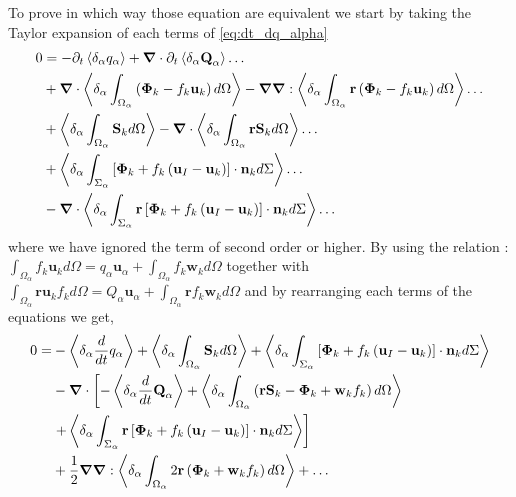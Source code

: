 To prove in which way those equation are equivalent we start by taking the Taylor expansion of each terms of \ref{eq:dt_dq_alpha} 
\begin{align}    
    0 &= 
    - \partial_t \left<\delta_\alpha q_\alpha\right> +  \bm{\nabla} \cdot  \partial_t\left<\delta_\alpha \textbf{Q}_\alpha\right> \ldots\nonumber\\
    &+ \bm{\nabla} \cdot \left<\delta_\alpha \int_{\Omega_\alpha}\left(\mathbf{\Phi}_k - f_k \textbf{u}_k \right)d\Omega\right>
    -\bm{\nabla}\bm{\nabla} : \left<\delta_\alpha \int_{\Omega_\alpha}\textbf{r}\left(\mathbf{\Phi}_k - f_k \textbf{u}_k \right)d\Omega\right>
    \ldots\nonumber\\
    &+ \left<\delta_\alpha  \int_{\Omega_\alpha} \textbf{S}_k d\Omega\right>
    - \bm{\nabla} \cdot \left<\delta_\alpha  \int_{\Omega_\alpha} \textbf{r}\textbf{S}_k d\Omega\right>
    \ldots\nonumber\\
    &+ \left<\delta_\alpha \int_{\Sigma_\alpha}\left[
        \mathbf{\Phi}_k
        + f_k
        \left(
            \textbf{u}_I
            - \textbf{u}_k
        \right)
    \right]
    \cdot \textbf{n}_kd\Sigma\right> \ldots\nonumber\\
    &-  \bm{\nabla} \cdot \left<\delta_\alpha \int_{\Sigma_\alpha} \textbf{r}\left[
        \mathbf{\Phi}_k
        + f_k
        \left(
            \textbf{u}_I
            - \textbf{u}_k
        \right)
    \right]
    \cdot \textbf{n}_kd\Sigma\right> \ldots
\end{align}
where we have ignored the term of second order or higher. 
By using the relation : $\int_{\Omega_\alpha} f_k \textbf{u}_k d\Omega = q_\alpha\textbf{u}_\alpha  + \int_{\Omega_\alpha} f_k \textbf{w}_k d\Omega$
together with $\int_{\Omega_\alpha} \textbf{r} \textbf{u}_k f_k d\Omega = Q_\alpha\textbf{u}_\alpha  + \int_{\Omega_\alpha}\textbf{r} f_k \textbf{w}_k d\Omega$ and by  rearranging each terms of the equations we get, 
\begin{align}    
    0 = 
    &- \left<\delta_\alpha \frac{d}{d t} q_\alpha\right>
    + \left<\delta_\alpha  \int_{\Omega_\alpha} \textbf{S}_k d\Omega\right>
    + \left<\delta_\alpha \int_{\Sigma_\alpha}\left[
        \mathbf{\Phi}_k
        + f_k
        \left(
            \textbf{u}_I
            - \textbf{u}_k
        \right)
    \right]
    \cdot \textbf{n}_kd\Sigma\right> \nonumber\\
    &-  \bm{\nabla} \cdot  \left[
        - \left<\delta_\alpha \frac{d}{d t} \textbf{Q}_\alpha\right> 
         + \left<\delta_\alpha  \int_{\Omega_\alpha} \left(
            \textbf{r}\textbf{S}_k - \mathbf{\Phi}_k + \textbf{w}_kf_k 
         \right)d\Omega\right>
    \right.
    \nonumber\\
    &\left. 
         + \left<\delta_\alpha \int_{\Sigma_\alpha} \textbf{r}\left[
        \mathbf{\Phi}_k
        + f_k
        \left(
            \textbf{u}_I
            - \textbf{u}_k
        \right)
        \right]
        \cdot \textbf{n}_kd\Sigma\right> 
    \right]\nonumber\\
    &+  \frac{1}{2}\bm{\nabla}\bm{\nabla} :
         \left<\delta_\alpha  \int_{\Omega_\alpha} 2\textbf{r}\left(\mathbf{\Phi}_k + \textbf{w}_kf_k 
         \right)d\Omega\right>
         + \ldots
\end{align}
